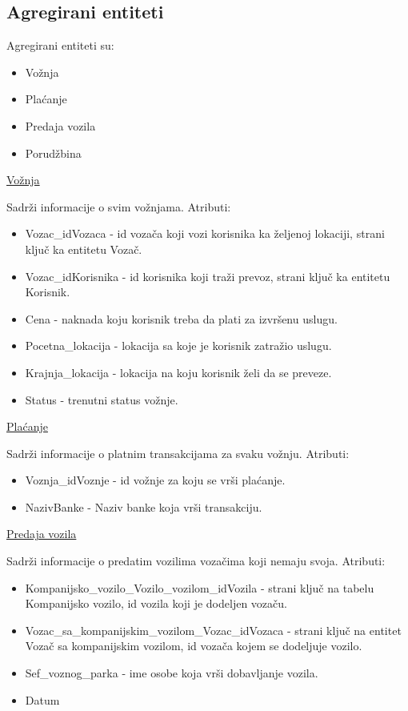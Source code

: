 \subsection{\textbf{Agregirani entiteti}}
Agregirani entiteti su:
\begin{itemize}
    \item Vožnja
    \item Plaćanje
    \item Predaja vozila
    \item Porudžbina
\end{itemize}

\begin{flushleft}
\underline{Vožnja}
\end{flushleft}
Sadrži informacije o svim vožnjama. Atributi:
\begin{itemize}
    \item Vozac\_idVozaca - id vozača koji vozi korisnika ka željenoj lokaciji, strani ključ ka entitetu Vozač.
    \item Vozac\_idKorisnika - id korisnika koji traži prevoz, strani ključ ka entitetu Korisnik.
    \item Cena - naknada koju korisnik treba da plati za izvršenu uslugu.
    \item Pocetna\_lokacija - lokacija sa koje je korisnik zatražio uslugu.
    \item Krajnja\_lokacija - lokacija na koju korisnik želi da se preveze.
    \item Status - trenutni status vožnje.
\end{itemize}

\begin{flushleft}
\underline{Plaćanje}
\end{flushleft}
Sadrži informacije o platnim transakcijama za svaku vožnju. Atributi:
\begin{itemize}
    \item Voznja\_idVoznje - id vožnje za koju se vrši plaćanje.
    \item NazivBanke - Naziv banke koja vrši transakciju.
\end{itemize}

\begin{flushleft}
\underline{Predaja vozila}
\end{flushleft}
Sadrži informacije o predatim vozilima vozačima koji nemaju svoja. Atributi:
\begin{itemize}
    \item Kompanijsko\_vozilo\_Vozilo\_vozilom\_idVozila - strani ključ na tabelu Kompanijsko vozilo, id vozila koji je dodeljen vozaču.
    \item Vozac\_sa\_kompanijskim\_vozilom\_Vozac\_idVozaca - strani ključ na entitet Vozač sa kompanijskim vozilom, id vozača kojem se dodeljuje vozilo.
    \item Sef\_voznog\_parka - ime osobe koja vrši dobavljanje vozila.
    \item Datum
\end{itemize}

